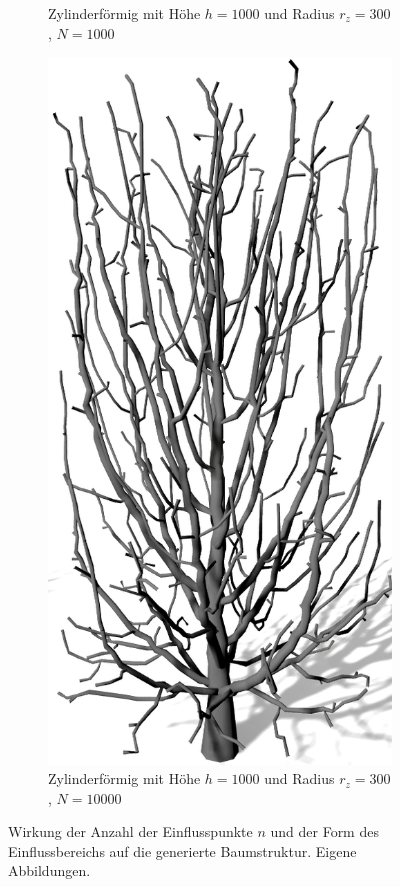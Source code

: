 \begin{figure} [hbtp]
\begin{subfigure}[t]{.45\textwidth}
		\caption{Zylinderförmig mit Höhe $h=1000$ und Radius $r_z = 300$, $N = 1000$}
		\label{subfig:SCA_Einfluss_Cylinder_Low}
	\end{subfigure}
	\hspace{.05\linewidth}
	\begin{subfigure}[t]{.45\textwidth}
		\centering
		\includegraphics[height=.25\textheight]{images/SCA_Einfluss_Cylinder_High.png}
		\caption{Zylinderförmig mit Höhe $h=1000$ und Radius $r_z = 300$, $N = 10000$}
		\label{subfig:SCA_Einfluss_Cylinder_High}
	\end{subfigure}
	\caption{Wirkung der Anzahl der Einflusspunkte $n$ und der Form des Einflussbereichs auf die generierte Baumstruktur. Eigene Abbildungen.}
	\label{fig:SCA_Einfluss}
\end{figure}
 
